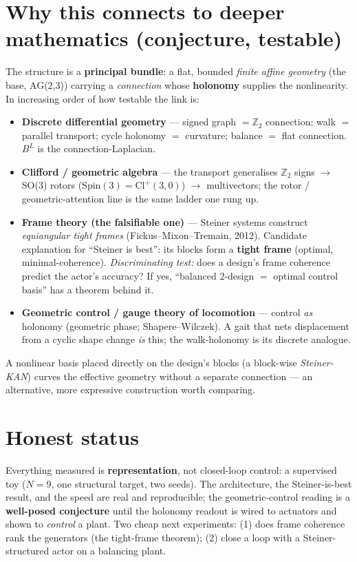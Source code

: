 \documentclass[11pt]{article}
\begin{document}
\section{Why this connects to deeper mathematics (conjecture, testable)}
The structure is a \textbf{principal bundle}: a flat, bounded \emph{finite affine geometry} (the base, AG(2,3))
carrying a \emph{connection} whose \textbf{holonomy} supplies the nonlinearity. In increasing order of how
testable the link is:
\begin{itemize}[nosep]
  \item \textbf{Discrete differential geometry} --- signed graph $=\mathbb{Z}_2$ connection; walk $=$ parallel
        transport; cycle holonomy $=$ curvature; balance $=$ flat connection. $B^{L}$ is the connection-Laplacian.
  \item \textbf{Clifford / geometric algebra} --- the transport generalises $\mathbb{Z}_2$ signs $\to$ SO(3)
        rotors ($\mathrm{Spin}(3)=\mathrm{Cl}^{+}(3,0)$) $\to$ multivectors; the rotor / geometric-attention line
        is the same ladder one rung up.
  \item \textbf{Frame theory (the falsifiable one)} --- Steiner systems construct \emph{equiangular tight frames}
        (Fickus--Mixon--Tremain, 2012). Candidate explanation for ``Steiner is best'': its blocks form a
        \textbf{tight frame} (optimal, minimal-coherence). \emph{Discriminating test:} does a design's frame
        coherence predict the actor's accuracy? If yes, ``balanced 2-design $=$ optimal control basis'' has a
        theorem behind it.
  \item \textbf{Geometric control / gauge theory of locomotion} --- control \emph{as} holonomy (geometric phase;
        Shapere--Wilczek). A gait that nets displacement from a cyclic shape change \emph{is} this; the
        walk-holonomy is its discrete analogue.
\end{itemize}
A nonlinear basis placed directly on the design's blocks (a block-wise \emph{Steiner-KAN}) curves the effective
geometry without a separate connection --- an alternative, more expressive construction worth comparing.

\section{Honest status}
Everything measured is \textbf{representation}, not closed-loop control: a supervised toy ($N{=}9$, one structural
target, two seeds). The architecture, the Steiner-is-best result, and the speed are real and reproducible; the
geometric-control reading is a \textbf{well-posed conjecture} until the holonomy readout is wired to actuators and
shown to \emph{control} a plant. Two cheap next experiments: (1) does frame coherence rank the generators (the
tight-frame theorem); (2) close a loop with a Steiner-structured actor on a balancing plant.
\end{document}

